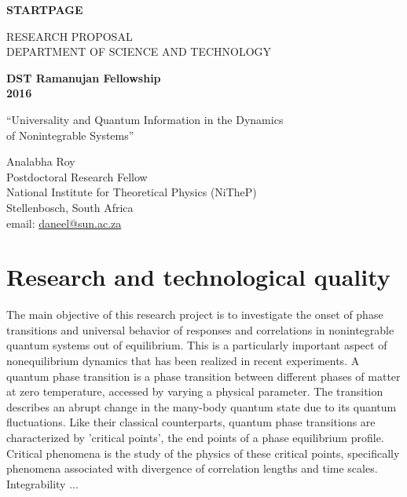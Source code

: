 \documentclass[a4paper,11pt,color]{article}
\def\Acronimo{Universality and  Quantum Information in the Dynamics\\ of Nonintegrable Systems}
\begin{document}

\phantom{a}
\vspace{15mm}
\begin{center}


        \Large{
      
     
        \textbf{STARTPAGE}
  
          \vspace{15mm}
          RESEARCH PROPOSAL\\
          DEPARTMENT OF SCIENCE AND TECHNOLOGY\\
          \vspace{1cm}
          
          \textbf{DST Ramanujan Fellowship}\\
          \textbf{2016}
          \vspace{2cm}                   

          
          \vspace{2cm}

          ``\Acronimo''
                    \vspace{2cm}

          Analabha Roy \\
          Postdoctoral Research Fellow \\
          National Institute for Theoretical Physics (NiTheP) \\
          Stellenbosch, South Africa \\
          email: \url{daneel@sun.ac.za}
        }

  \end{center}
\vspace{1cm}

\pagebreak

 
\section{Research and technological quality}
\label{sec:sciTecQuality}

The main objective of this research project is to investigate the onset of phase transitions and universal behavior of responses and correlations in nonintegrable quantum systems out of equilibrium. This is a particularly important aspect of nonequilibrium dynamics that has been realized in recent experiments. A quantum phase transition is a phase transition between different phases of matter at zero temperature, accessed by varying a physical parameter. The transition describes an abrupt change in the many-body quantum state due to its quantum fluctuations. Like their classical counterparts, quantum phase transitions are characterized by 'critical points', the end points of a phase equilibrium profile.  Critical phenomena is the study of the physics of these critical points, specifically phenomena associated with 
divergence of correlation lengths and time scales. Integrability ...
\end{document}
